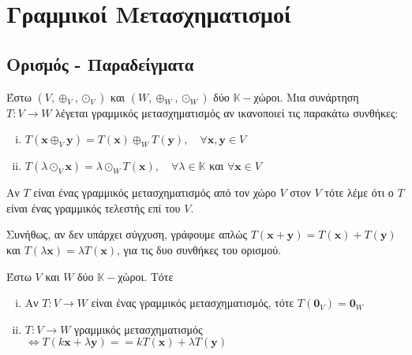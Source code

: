 



\pagestyle{vangelis}




\chapter{Γραμμικοί Μετασχηματισμοί}

\section{Ορισμός - Παραδείγματα}

\begin{dfn}
  Έστω $ (V, \oplus _{V}, \odot _{V}) $ και $ (W, \oplus _{W}, \odot _{W}) $ δύο 
  $ \mathbb{K} - $χώροι. Μια συνάρτηση $ T \colon V \to W $ λέγεται 
  \textcolor{Col1}{γραμμικός μετασχηματισμός} αν ικανοποιεί τις παρακάτω συνθήκες:
  \begin{enumerate}[i)]
    \item $ T(\mathbf{x} \oplus _{V} \mathbf{y}) = T(\mathbf{x}) \oplus _{W}
      T(\mathbf{y}), \quad \forall \mathbf{x}, \mathbf{y}  \in V $
    \item $ T(\lambda \odot _{V} \mathbf{x}) = \lambda \odot _{W} T(\mathbf{x}), 
      \quad \forall \lambda \in \mathbb{K} $ και $ \forall \mathbf{x} \in V $
  \end{enumerate}
  Αν $T$ είναι ένας γραμμικός μετασχηματισμός από τον χώρο $V$ στον $V$ τότε λέμε 
  ότι ο $T$ είναι ένας \textcolor{Col1}{γραμμικός τελεστής} επί του $V$. 
\end{dfn}

\begin{rem}
  Συνήθως, αν δεν υπάρχει σύγχυση, γράφουμε απλώς $ T(\mathbf{x}+ \mathbf{y}) =
  T(\mathbf{x}) + T(\mathbf{y}) $ και 
  $ T(\lambda \mathbf{x}) = \lambda T(\mathbf{x}) $, για τις δυο συνθήκες του ορισμού.
\end{rem}

\begin{prop}
  Έστω $ V $ και $W$ δύο $ \mathbb{K}- $χώροι. Τότε 
  \begin{enumerate}[i)]
    \item Αν $ T \colon V \to W $ είναι ένας γραμμικός μετασχηματισμός, τότε 
      $ T(\mathbf{0}_{V}) = \mathbf{0}_{W} $
    \item $ T \colon V \to W $ γραμμικός μετασχηματισμός $ \Leftrightarrow T(k
      \mathbf{x} + \lambda \mathbf{y}) = = k T(\mathbf{x}) + \lambda T(\mathbf{y}) $
  \end{enumerate}
\end{prop}

